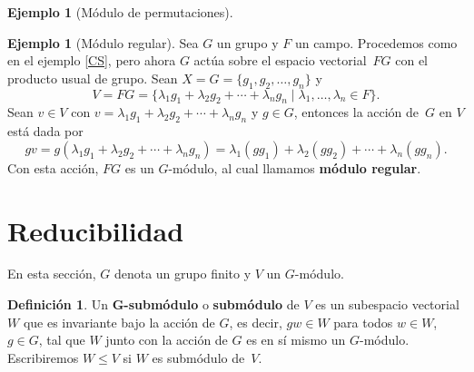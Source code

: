 \documentclass[12pt]{book}
\theoremstyle{definition}
\newtheorem{definition}[theorem]{Definición}
\newtheorem{example}[theorem]{Ejemplo}
\newcounter{in}
\newcounter{ini}
\begin{document}
\begin{example}[Módulo de permutaciones]
\end{example}

\begin{example}[Módulo regular]
  \label{regular}
  Sea $G$ un grupo y $F$ un campo. Procedemos como en el ejemplo \ref{CS}, pero ahora $G$
  actúa sobre el espacio vectorial~$FG$ con el producto usual de
  grupo. Sean $X=G=\{g_{1},g_{2},\ldots,g_{n}\}$ y 
  \begin{equation*}
    V=FG=\{\lambda_{1}g_{1}+\lambda_{2}g_{2}+\cdots
    +\lambda_{n}g_{n}\mid\lambda_{1},\ldots,\lambda_{n}\in F\}.
  \end{equation*}
 Sean $v\in V$ con $v=\lambda_{1}g_{1}+\lambda_{2}g_{2}+\cdots
 +\lambda_{n}g_{n}$ y $g\in G$, entonces la acción de~$G$ en $V$ está dada por
  \begin{equation*}
    gv=g(\lambda_{1}g_{1}+\lambda_{2}g_{2}+\cdots +\lambda_{n}g_{n})=\lambda_{1}(gg_{1})+\lambda_{2}(gg_{2})+\cdots +\lambda_{n}(gg_{n}).
  \end{equation*}
Con esta acción, $FG$ es un $G$-módulo, al cual llamamos \textbf{módulo regular}.  
\end{example}

\section{Reducibilidad}
\label{reducibilidad}

En esta sección, $G$ denota un grupo finito y $V$ un $G$-módulo.

\begin{definition}
  Un $\boldsymbol{G}$\textbf{-submódulo} o
  \textbf{submódulo} de $V$ es un subespacio vectorial
  $W$ que es invariante bajo la acción de $G$, es decir, $ gw\in W$
  para todos $w\in W$, $g\in G$, tal que $W$ junto con la acción de
  $G$ es en sí mismo un $G$-módulo. Escribiremos $W\leq V$ si $W$ es
  submódulo de~$V$. 
\end{definition}
\end{document}
